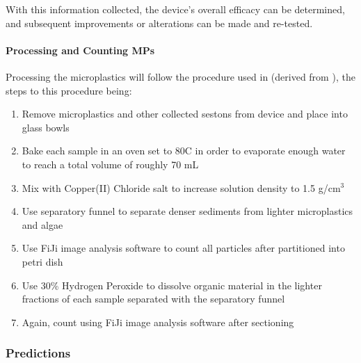 \documentclass[fleqn,10pt]{SelfArx} %
\begin{document}
	With this information collected, the device’s overall efficacy can be determined, and subsequent improvements or alterations can be made and re-tested.
	
	\paragraph*{Processing and Counting MPs}
	\label{sec:processing}
	Processing the microplastics will follow the procedure used in \cite{LenakerEtAlvertdist}(derived from \cite{Zobkov_Esiukova_2016}), the steps to this procedure being:
	\begin{enumerate}
		\item Remove microplastics and other collected \glspl{seston} from device and place into glass bowls 
		\item Bake each sample in an oven set to 80\textdegree C in order to evaporate enough water to reach a total volume of roughly 70 mL
		\item Mix with Copper(II) Chloride salt to increase solution density to 1.5 g/cm$^3$  
		\item Use separatory funnel to separate denser sediments from lighter microplastics and algae
		\item Use FiJi image analysis software to count all particles after partitioned into petri dish
		\item Use 30\% Hydrogen Peroxide to dissolve organic material in the lighter fractions of each sample separated with the separatory funnel
		\item Again, count using FiJi image analysis software after sectioning
	\end{enumerate}
	
	\subsubsection{Predictions}
	\label{subsubsec:predictions}
\end{document}
